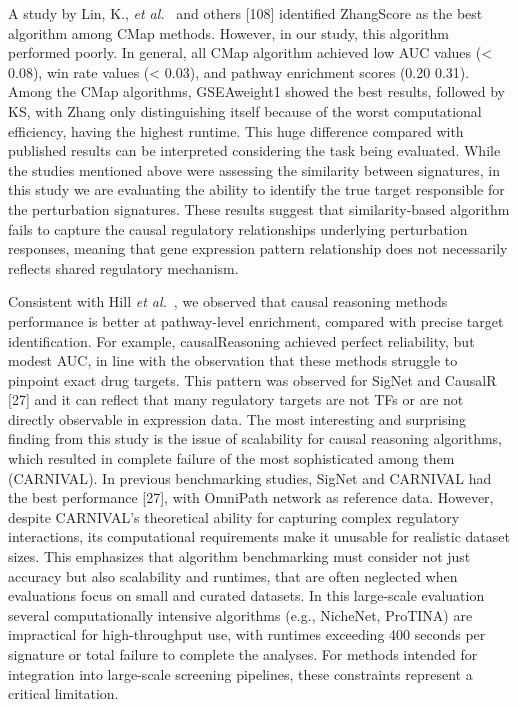 A study by Lin, K., \textit{et al.}~\cite{RN79} and others [108] identified ZhangScore as the best algorithm among \gls{CMap} methods. 
However, in our study, this algorithm performed poorly. 
In general, all \gls{CMap} algorithm achieved low \gls{AUC} values (< 0.08), win rate values (< 0.03), and pathway enrichment scores (0.20  0.31). 
Among the \gls{CMap} algorithms, GSEAweight1 showed the best results, followed by \gls{KS}, with Zhang only distinguishing itself because of the worst computational efficiency, having the highest runtime. 
This huge difference compared with published results can be interpreted considering the task being evaluated. 
While the studies mentioned above were assessing the similarity between signatures, in this study we are evaluating the ability to identify the true target responsible for the perturbation signatures. 
These results suggest that similarity-based algorithm fails to capture the causal regulatory relationships underlying perturbation responses, meaning that gene expression pattern relationship does not necessarily reflects shared regulatory mechanism.

Consistent with Hill \textit{et al.}~\cite{RN37}, we observed that causal reasoning methods performance is better at pathway-level enrichment, compared with precise target identification. 
For example, causalReasoning achieved perfect reliability, but modest \gls{AUC}, in line with the observation that these methods struggle to pinpoint exact drug targets. 
This pattern was observed for SigNet and CausalR [27] and it can reflect that many regulatory targets are not \gls{TF}s or are not directly observable in expression data. 
The most interesting and surprising finding from this study is the issue of scalability for causal reasoning algorithms, which resulted in complete failure of the most sophisticated among them (\gls{CARNIVAL}). 
In previous benchmarking studies, SigNet and CARNIVAL had the best performance [27], with OmniPath network as reference data. 
However, despite \gls{CARNIVAL}'s theoretical ability for capturing complex regulatory interactions, its computational requirements make it unusable for realistic dataset sizes. 
This emphasizes that algorithm benchmarking must consider not just accuracy but also scalability and runtimes, that are often neglected when evaluations focus on small and curated datasets. 
In this large-scale evaluation several computationally intensive algorithms (e.g., NicheNet, ProTINA) are impractical for high-throughput use, with runtimes exceeding 400 seconds per signature or total failure to complete the analyses. 
For methods intended for integration into large-scale screening pipelines, these constraints represent a critical limitation.

